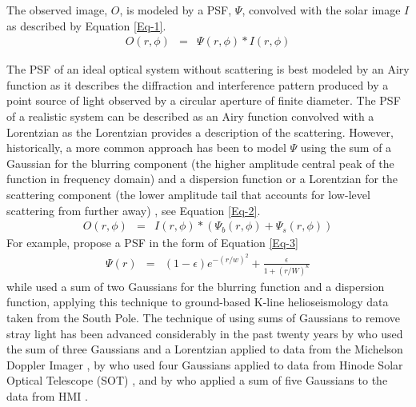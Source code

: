 \documentclass[trackchanges]{aastex62}
\begin{document}
The observed image, $O$, is modeled by a PSF, $\Psi$, convolved with the solar image $I$ as described by Equation \ref{Eq-1}.  
   \begin{eqnarray}   
     O(r,\phi) &=& \Psi(r,\phi) \ast I(r,\phi)           
      \label{Eq-1}    
   \end{eqnarray}

The PSF of an ideal optical system without scattering is best modeled by an Airy function \citep{airy:1838} as it describes the diffraction and interference pattern produced by a point source of light observed by a circular aperture of finite diameter. The PSF of a realistic system can be described as an Airy function convolved with a Lorentzian as the Lorentzian provides a description of the scattering. However, historically, a more common approach has been to model $\Psi$  using the sum of a Gaussian for the blurring component (the higher amplitude central peak of the function in frequency domain) and a dispersion function or a Lorentzian for the scattering component (the lower amplitude tail that accounts for low-level scattering from further away) \citep{zwaan:1965, jefferies:1991}, see Equation \ref{Eq-2}.  
   \begin{eqnarray}   
      O(r,\phi)  &=& I(r, \phi) \ast (\Psi_{b}(r, \phi) + \Psi_{s}(r, \phi))
     \label{Eq-2}
    \end{eqnarray}
For example, \citet{pierce:1977} propose a PSF in the form of Equation \ref{Eq-3}
   \begin{eqnarray}   
     \Psi(r) &=& ( 1 - \epsilon )e^{-(r/w)^2} +  \frac{\epsilon} {1 + (r/W)^\kappa}   
       \label{Eq-3}    
   \end{eqnarray}
while \citet{jefferies:1991} used a sum of two Gaussians for the blurring function and a dispersion function, applying this technique to ground-based K-line helioseismology data taken from the South Pole. 
The technique of using sums of Gaussians to remove stray light has been advanced considerably in the past twenty years by \citet{mathew:2007} who used the sum of three Gaussians and a Lorentzian applied to data from the Michelson Doppler Imager \citep{scherrer:1995}, by \citet{mathew:2009} who used four Gaussians applied to data from Hinode Solar Optical Telescope (SOT) \citep{tsuneta:2008}, and by \citet{yeo:2014} who applied a sum of five Gaussians to the data from HMI \citep{scherrer:2012}.
\end{document}
